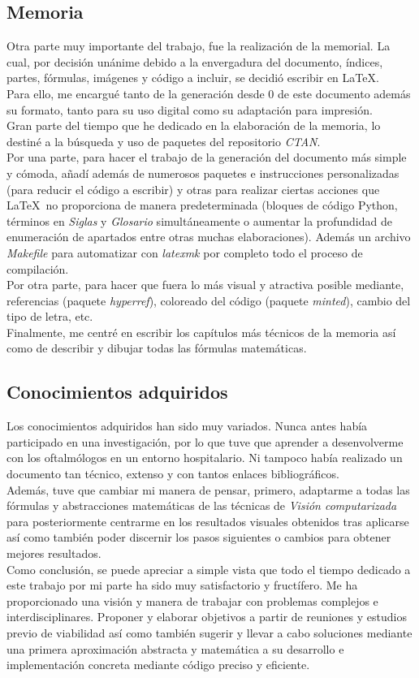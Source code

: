 \subsection{Memoria}
Otra parte muy importante del trabajo, fue la realización de la
memorial. La cual, por decisión unánime debido a la envergadura del
documento, índices, partes, fórmulas, imágenes y código a incluir, se
decidió escribir en \LaTeX.\\
Para ello, me encargué tanto de la generación desde $0$ de este
documento además su formato, tanto para su uso digital como su
adaptación para impresión.\\
Gran parte del tiempo que he dedicado en la elaboración de la memoria,
lo destiné a la búsqueda y uso de paquetes del repositorio
\emph{CTAN}.\\
Por una parte, para hacer el trabajo de la generación del documento
más simple y cómoda, añadí además de numerosos paquetes e
instrucciones personalizadas (para reducir el código a escribir) y
otras para realizar ciertas acciones que \LaTeX\ no proporciona de
manera predeterminada (bloques de código Python, términos en
\emph{Siglas} y \emph{Glosario} simultáneamente o aumentar la
profundidad de enumeración de apartados entre otras muchas
elaboraciones). Además un archivo \emph{Makefile} para automatizar con
\emph{latexmk} por completo todo el proceso de compilación.\\
Por otra parte, para hacer que fuera lo más visual y atractiva posible
mediante, referencias (paquete \emph{hyperref}), coloreado del código
(paquete \emph{minted}), cambio del tipo de letra, etc.\\
Finalmente, me centré en escribir los capítulos más técnicos de la
memoria así como de describir y dibujar todas las fórmulas
matemáticas.

\subsection{Conocimientos adquiridos}
Los conocimientos adquiridos han sido muy variados. Nunca antes había
participado en una investigación, por lo que tuve que aprender a
desenvolverme con los oftalmólogos en un entorno hospitalario. Ni
tampoco había realizado un documento tan técnico, extenso y con tantos
enlaces bibliográficos.\\
Además, tuve que cambiar mi manera de pensar, primero, adaptarme a
todas las fórmulas y abstracciones matemáticas de las técnicas de
\emph{Visión computarizada} para posteriormente centrarme en los
resultados visuales obtenidos tras aplicarse así como también poder
discernir los pasos siguientes o cambios para obtener mejores
resultados.\\
Como conclusión, se puede apreciar a simple vista que todo el tiempo
dedicado a este trabajo por mi parte ha sido muy satisfactorio y
fructífero. Me ha proporcionado una visión y manera de trabajar con
problemas complejos e interdisciplinares. Proponer y elaborar
objetivos a partir de reuniones y estudios previo de viabilidad así
como también sugerir y llevar a cabo soluciones mediante una primera
aproximación abstracta y matemática a su desarrollo e implementación
concreta mediante código preciso y eficiente.
